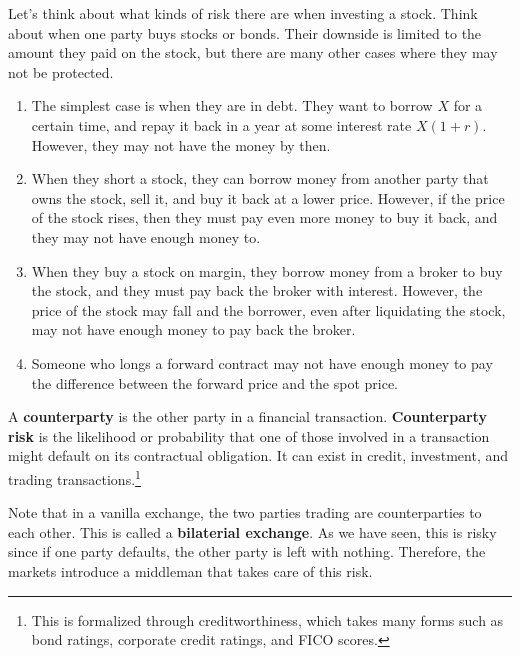 \documentclass{article}
\begin{document}
    \begin{example}
      Let's think about what kinds of risk there are when investing a stock. Think about when one party buys stocks or bonds. Their downside is limited to the amount they paid on the stock, but there are many other cases where they may not be protected. 
      \begin{enumerate}
        \item The simplest case is when they are in debt. They want to borrow $X$ for a certain time, and repay it back in a year at some interest rate $X (1 + r)$. However, they may not have the money by then. 
        \item When they short a stock, they can borrow money from another party that owns the stock, sell it, and buy it back at a lower price. However, if the price of the stock rises, then they must pay even more money to buy it back, and they may not have enough money to. 
        \item When they buy a stock on margin, they borrow money from a broker to buy the stock, and they must pay back the broker with interest. However, the price of the stock may fall and the borrower, even after liquidating the stock, may not have enough money to pay back the broker.
        \item Someone who longs a forward contract may not have enough money to pay the difference between the forward price and the spot price.
      \end{enumerate}
    \end{example}

    \begin{definition}[Counterparty]
      A \textbf{counterparty} is the other party in a financial transaction. \textbf{Counterparty risk} is the likelihood or probability that one of those involved in a transaction might default on its contractual obligation. It can exist in credit, investment, and trading transactions.\footnote{This is formalized through creditworthiness, which takes many forms such as bond ratings, corporate credit ratings, and FICO scores.}
    \end{definition}
    
    Note that in a vanilla exchange, the two parties trading are counterparties to each other. This is called a \textbf{bilaterial exchange}. As we have seen, this is risky since if one party defaults, the other party is left with nothing. Therefore, the markets introduce a middleman that takes care of this risk. 
\end{document}
